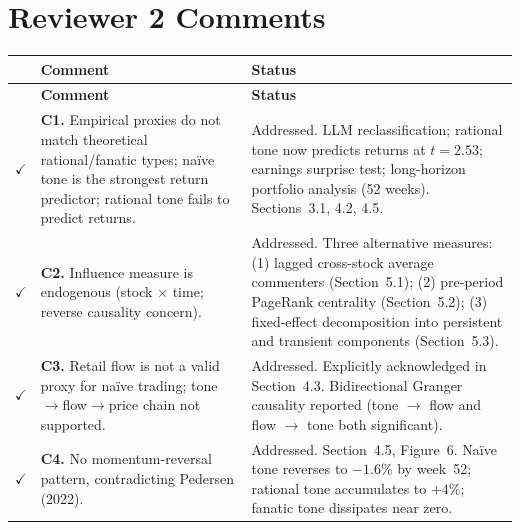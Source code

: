 \documentclass[11pt]{article}
\newcommand{\done}{\textcolor{done}{$\checkmark$}}
\begin{document}
\section{Reviewer 2 Comments}

\begin{longtable}{p{} p{} p{}}
\toprule
& \textbf{Comment} & \textbf{Status} \\
\midrule
\endfirsthead
\toprule
& \textbf{Comment} & \textbf{Status} \\
\midrule
\endhead
\bottomrule
\endfoot

\done & \textbf{C1.} Empirical proxies do not match theoretical rational/fanatic types; na\"{i}ve tone is the strongest return predictor; rational tone fails to predict returns. &
  Addressed. LLM reclassification; rational tone now predicts returns at $t=2.53$; earnings surprise test; long-horizon portfolio analysis (52 weeks). Sections~3.1, 4.2, 4.5. \\[6pt]

\done & \textbf{C2.} Influence measure is endogenous (stock $\times$ time; reverse causality concern). &
  Addressed. Three alternative measures: (1) lagged cross-stock average commenters (Section~5.1); (2) pre-period PageRank centrality (Section~5.2); (3) fixed-effect decomposition into persistent and transient components (Section~5.3). \\[6pt]

\done & \textbf{C3.} Retail flow is not a valid proxy for na\"{i}ve trading; tone$\to$flow$\to$price chain not supported. &
  Addressed. Explicitly acknowledged in Section~4.3. Bidirectional Granger causality reported (tone $\to$ flow and flow $\to$ tone both significant). \\[6pt]

\done & \textbf{C4.} No momentum-reversal pattern, contradicting Pedersen (2022). &
  Addressed. Section~4.5, Figure~6. Na\"{i}ve tone reverses to $-1.6\%$ by week~52; rational tone accumulates to $+4\%$; fanatic tone dissipates near zero. \\

\end{longtable}
\end{document}
